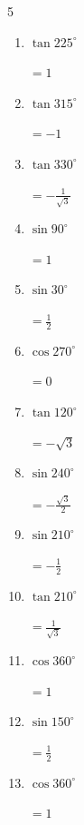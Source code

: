 \begin{multicols}{5}
\begin{enumerate}
        $\displaystyle =0$

  \item $\displaystyle \tan{225^\circ}$

        $\displaystyle =1$

  \item $\displaystyle \tan{315^\circ}$

        $\displaystyle =-1$

  \item $\displaystyle \tan{330^\circ}$

        $\displaystyle =-\frac{1}{\sqrt{3}}$

  \item $\displaystyle \sin{90^\circ}$

        $\displaystyle =1$

  \item $\displaystyle \sin{30^\circ}$

        $\displaystyle =\frac{1}{2}$

  \item $\displaystyle \cos{270^\circ}$

        $\displaystyle =0$

  \item $\displaystyle \tan{120^\circ}$

        $\displaystyle =-\sqrt{3}$

  \item $\displaystyle \sin{240^\circ}$

        $\displaystyle =-\frac{\sqrt{3}}{2}$

  \item $\displaystyle \sin{210^\circ}$

        $\displaystyle =-\frac{1}{2}$

  \item $\displaystyle \tan{210^\circ}$

        $\displaystyle =\frac{1}{\sqrt{3}}$

  \item $\displaystyle \cos{360^\circ}$

        $\displaystyle =1$

  \item $\displaystyle \sin{150^\circ}$

        $\displaystyle =\frac{1}{2}$

  \item $\displaystyle \cos{360^\circ}$

        $\displaystyle =1$


\end{enumerate}
\end{multicols}
